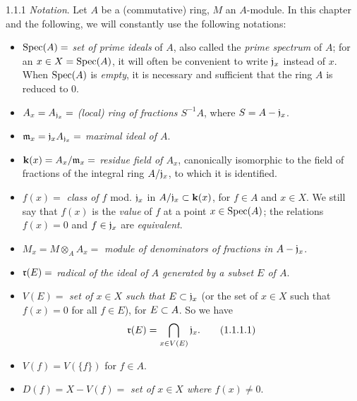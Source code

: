 \documentclass[../main.tex]{subfiles}
\begin{document}
\begin{env}{1.1.1}
\emph{Notation}. Let $A$ be a (commutative) ring, $M$ an $A$-module. In
this chapter and the following, we will constantly use the following notations:
\begin{itemize}
  \item[] $\operatorname{Spec}(A)=$ \emph{set of prime ideals} of $A$, also called the
          \emph{prime spectrum} of $A$; for an $x\in X=\operatorname{Spec}(A)$, it will often be
          convenient to write $\mathfrak{j}_x$ instead of $x$. When $\operatorname{Spec}(A)$ is
          \emph{empty}, it is necessary and sufficient that the ring $A$ is
          reduced to $0$.
  \item[] $A_x=A_{\mathfrak{j}_x}=$ \emph{(local) ring of fractions $S^{-1}A$},
          where $S=A-\mathfrak{j}_x$.
  \item[] $\mathfrak{m}_x=\mathfrak{j}_x A_{\mathfrak{j}_x}=$ \emph{maximal ideal of $A$}.
  \item[] $\mathbf{k}(x)=A_x/\mathfrak{m}_x=$ \emph{residue field of $A_x$},
          canonically isomorphic to the field of fractions
          of the integral ring $A/\mathfrak{j}_x$, to which it is identified.
  \item[] $f(x)=$ \emph{class of $f$} mod. $\mathfrak{j}_x$ in $A/\mathfrak{j}_x\subset\mathbf{k}(x)$,
          for $f\in A$ and $x\in X$. We still say that $f(x)$ is the \emph{value}
          of $f$ at a point $x\in\operatorname{Spec}(A)$; the relations $f(x)=0$ and $f\in\mathfrak{j}_x$ are
          \emph{equivalent}.
  \item[] $M_x=M\otimes_A A_x=$ \emph{module of denominators of fractions in $A-\mathfrak{j}_x$}.
  \item[] $\mathfrak{r}(E)=$ \emph{radical of the ideal of $A$ generated by a subset $E$ of $A$}.
  \item[] $V(E)=$ \emph{set of $x\in X$ such that $E\subset\mathfrak{j}_x$} (or the set of $x\in X$
          such that $f(x)=0$ for all $f\in E$), for $E\subset A$. So we have
          \begin{equation}
            \mathfrak{r}(E)=\bigcap_{x\in V(E)}\mathfrak{j}_x.\tag{1.1.1.1}
          \end{equation}
  \item[] $V(f)=V(\{f\})$ for $f\in A$.
  \item[] $D(f)=X-V(f)=$ \emph{set of $x\in X$ where $f(x)\neq 0$}.
\end{itemize}
\end{env}
\end{document}
